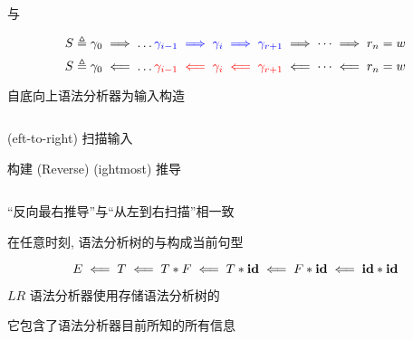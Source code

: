 \begin{frame}{}
  \begin{center}
     与 

    \[
      S \triangleq \gamma_{0} \implies \dots
        \textcolor{blue}{\gamma_{i-1} \implies \gamma_{i} \implies \gamma_{r+1}}
        \implies \dots \implies r_{n} = w
    \]
    \[
      S \triangleq \gamma_{0} \impliedby \dots
        \textcolor{red}{\gamma_{i-1} \impliedby \gamma_{i} \impliedby \gamma_{r+1}}
        \impliedby \dots \impliedby r_{n} = w
    \]

    \vspace{0.80cm}
    自底向上语法分析器为输入构造
  \end{center}
\end{frame}

\begin{frame}{}
  \begin{center}

    \vspace{0.80cm}
    \begin{columns}
        \begin{description}
          \setlength{\itemsep}{15pt}
          \item[$L:$]  (eft-to-right) 扫描输入
          \item[$R:$] 构建 (Reverse)  (ightmost) 推导
        \end{description}
    \end{columns}

    \vspace{0.80cm}
    ``反向最右推导''与``从左到右扫描''相一致
  \end{center}
\end{frame}

\begin{frame}{}
  \begin{center}

    \vspace{0.80cm}
    在任意时刻, 语法分析树的与构成当前句型

    \vspace{0.60cm}
    \[
      E \impliedby T \impliedby T \ast F \impliedby T \ast \text{\bf id} \impliedby F \ast \text{\bf id}
        \impliedby \text{\bf id} \ast \text{\bf id}
    \]

    \vspace{0.60cm}
    $LR$ 语法分析器使用存储语法分析树的

    \vspace{0.30cm}
    它包含了语法分析器目前所知的所有信息
  \end{center}
\end{frame}

